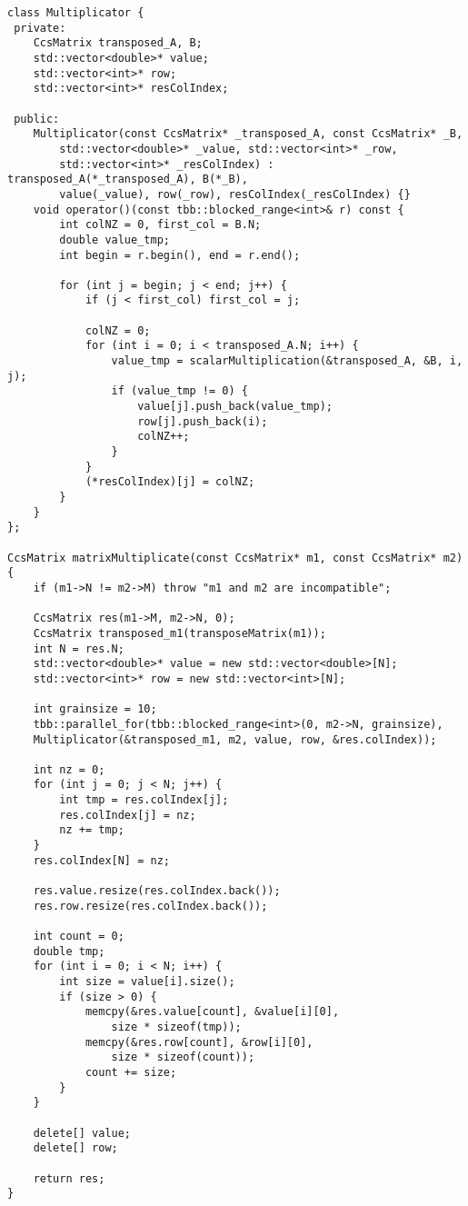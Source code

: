 \documentclass{report}
\begin{document}
\begin{lstlisting}
class Multiplicator {
 private:
    CcsMatrix transposed_A, B;
    std::vector<double>* value;
    std::vector<int>* row;
    std::vector<int>* resColIndex;

 public:
    Multiplicator(const CcsMatrix* _transposed_A, const CcsMatrix* _B,
        std::vector<double>* _value, std::vector<int>* _row,
        std::vector<int>* _resColIndex) : transposed_A(*_transposed_A), B(*_B),
        value(_value), row(_row), resColIndex(_resColIndex) {}
    void operator()(const tbb::blocked_range<int>& r) const {
        int colNZ = 0, first_col = B.N;
        double value_tmp;
        int begin = r.begin(), end = r.end();

        for (int j = begin; j < end; j++) {
            if (j < first_col) first_col = j;

            colNZ = 0;
            for (int i = 0; i < transposed_A.N; i++) {
                value_tmp = scalarMultiplication(&transposed_A, &B, i, j);
                if (value_tmp != 0) {
                    value[j].push_back(value_tmp);
                    row[j].push_back(i);
                    colNZ++;
                }
            }
            (*resColIndex)[j] = colNZ;
        }
    }
};

CcsMatrix matrixMultiplicate(const CcsMatrix* m1, const CcsMatrix* m2) {
    if (m1->N != m2->M) throw "m1 and m2 are incompatible";

    CcsMatrix res(m1->M, m2->N, 0);
    CcsMatrix transposed_m1(transposeMatrix(m1));
    int N = res.N;
    std::vector<double>* value = new std::vector<double>[N];
    std::vector<int>* row = new std::vector<int>[N];

    int grainsize = 10;
    tbb::parallel_for(tbb::blocked_range<int>(0, m2->N, grainsize),
    Multiplicator(&transposed_m1, m2, value, row, &res.colIndex));

    int nz = 0;
    for (int j = 0; j < N; j++) {
        int tmp = res.colIndex[j];
        res.colIndex[j] = nz;
        nz += tmp;
    }
    res.colIndex[N] = nz;

    res.value.resize(res.colIndex.back());
    res.row.resize(res.colIndex.back());

    int count = 0;
    double tmp;
    for (int i = 0; i < N; i++) {
        int size = value[i].size();
        if (size > 0) {
            memcpy(&res.value[count], &value[i][0],
                size * sizeof(tmp));
            memcpy(&res.row[count], &row[i][0],
                size * sizeof(count));
            count += size;
        }
    }

    delete[] value;
    delete[] row;

    return res;
}
\end{lstlisting}
\end{document}
